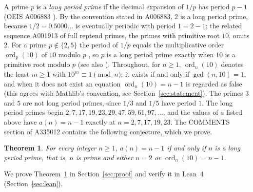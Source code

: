\documentclass[11pt]{amsart}
\theoremstyle{plain}
\newtheorem{theorem}{Theorem}
\theoremstyle{definition}
\DeclareMathOperator{\ord}{ord}
\begin{document}
A prime $p$ is a \emph{long period prime} if the decimal expansion of $1/p$ has period $p-1$ (OEIS A006883 \cite{A006883}).
By the convention stated in A006883, $2$ is a long period prime, because $1/2=0.5000\ldots$ is eventually periodic with period $1=2-1$; the related sequence A001913 \cite{A001913} of full reptend primes, the primes with primitive root $10$, omits $2$.
For a prime $p\notin\{2,5\}$ the period of $1/p$ equals the multiplicative order $\ord_p(10)$ of $10$ modulo $p$ \cite[Ch.~IX]{HW}, so $p$ is a long period prime exactly when $10$ is a primitive root modulo $p$ (see also \cite{MW}).
Throughout, for $n\ge1$, $\ord_n(10)$ denotes the least $m\ge1$ with $10^m\equiv1\pmod n$; it exists if and only if $\gcd(n,10)=1$, and when it does not exist an equation $\ord_n(10)=n-1$ is regarded as false (this agrees with Mathlib's convention, see Section~\ref{sec:statement}).
The primes $3$ and $5$ are not long period primes, since $1/3$ and $1/5$ have period $1$.
The long period primes begin $2,7,17,19,23,29,47,59,61,97,\dots$, and the values of $a$ listed above have $a(n)=n-1$ exactly at $n=2,7,17,19,23$.
The COMMENTS section of A335012 contains the following conjecture, which we prove.

\begin{theorem}\label{thm:main}
For every integer $n\ge1$, $a(n)=n-1$ if and only if $n$ is a long period prime, that is, $n$ is prime and either $n=2$ or $\ord_n(10)=n-1$.
\end{theorem}

We prove Theorem~\ref{thm:main} in Section~\ref{sec:proof} and verify it in Lean~4 (Section~\ref{sec:lean}).
\end{document}
